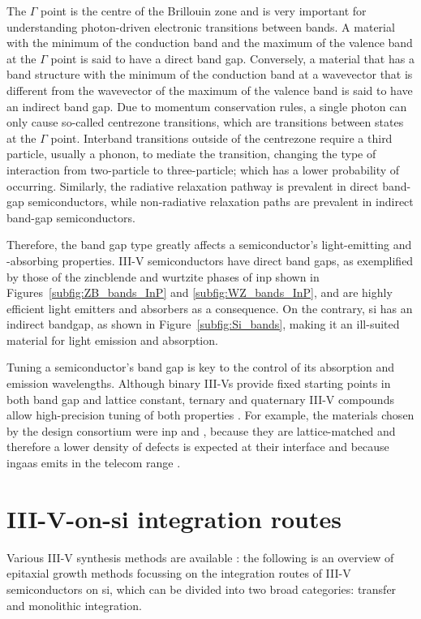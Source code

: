 The $\Gamma$ point is the centre of the Brillouin zone and is very important for understanding photon-driven electronic transitions between bands. A material with the minimum of the conduction band and the maximum of the valence band at the $\Gamma$ point is said to have a direct band gap. Conversely, a material that has a band structure with the minimum of the conduction band at a wavevector that is different from the wavevector of the maximum of the valence band is said to have an indirect band gap. Due to momentum conservation rules, a single photon can only cause so-called centrezone transitions, which are transitions between states at the $\Gamma$ point. Interband transitions outside of the centrezone require a third particle, usually a phonon, to mediate the transition, changing the type of interaction from two-particle to three-particle; which has a lower probability of occurring. Similarly, the radiative relaxation pathway is prevalent in direct band-gap semiconductors, while non-radiative relaxation paths are prevalent in indirect band-gap semiconductors.

Therefore, the band gap type greatly affects a semiconductor's light-emitting and -absorbing properties. III-V semiconductors have direct band gaps, as exemplified by those of the zincblende and wurtzite phases of  \acl{inp} shown in Figures~\ref{subfig:ZB_bands_InP} and \ref{subfig:WZ_bands_InP}, and are highly efficient light emitters and absorbers as a consequence. On the contrary, \acl{si} has an indirect bandgap, as shown in Figure~\ref{subfig:Si_bands}, making it an ill-suited material for light emission and absorption.

Tuning a semiconductor's band gap is key to the control of its absorption and emission wavelengths. Although binary III-Vs provide fixed starting points in both band gap and lattice constant, ternary and quaternary III-V compounds allow high-precision tuning of both properties \cite{Ning2017}. For example, the materials chosen by the \acs{design} consortium were \acs{inp} and , because they are lattice-matched and therefore a lower density of defects is expected at their interface \cite{Pearsall1980, Sugii1983, Wagner1970} and because \acs{ingaas} emits in the telecom range \cite{Scherrer2021, Seravalli2020}.

\section{\texorpdfstring{III-V-on-\acs{si} integration routes}{III-V-on-Si integration routes}}
Various III-V synthesis methods are available \cite{Kuech2016}: the following is an overview of epitaxial growth methods focussing on the integration routes of III-V semiconductors on \acl{si}, which can be divided into two broad categories: transfer and monolithic integration.

